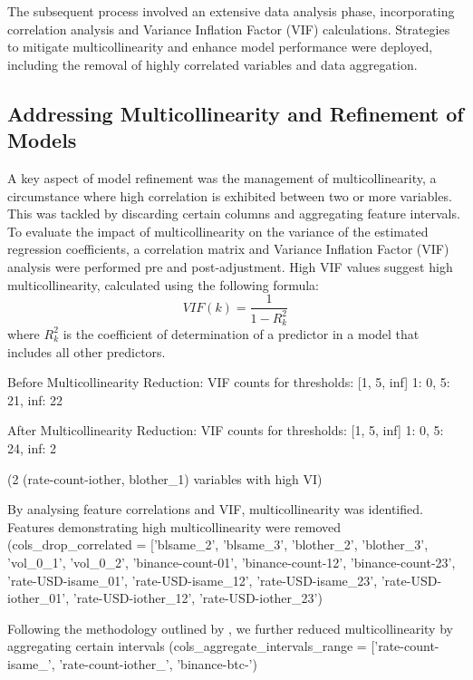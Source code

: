 \documentclass{article}
\begin{document}
The subsequent process involved an extensive data analysis phase, incorporating correlation analysis and Variance Inflation Factor (VIF) calculations. Strategies to mitigate multicollinearity and enhance model performance were deployed, including the removal of highly correlated variables and data aggregation.

\subsection{Addressing Multicollinearity and Refinement of Models}
A key aspect of model refinement was the management of multicollinearity, a circumstance where high correlation is exhibited between two or more variables. This was tackled by discarding certain columns and aggregating feature intervals. To evaluate the impact of multicollinearity on the variance of the estimated regression coefficients, a correlation matrix and Variance Inflation Factor (VIF) analysis were performed pre and post-adjustment. High VIF values suggest high multicollinearity, calculated using the following formula:
\begin{equation}
VIF(k) = \frac{1}{1 - R^2_k}
\end{equation}
where $R^2_k$ is the coefficient of determination of a predictor in a model that includes all other predictors. 

Before Multicollinearity Reduction: VIF counts for thresholds: [1, 5, inf]
1: 0, 5: 21, inf: 22

After Multicollinearity Reduction: VIF counts for thresholds: [1, 5, inf]
1: 0, 5: 24, inf: 2

(2 (rate-count-iother, blother\_1) variables with high VI)


By analysing feature correlations and VIF, multicollinearity was identified. Features demonstrating high multicollinearity were removed (cols\_drop\_correlated = ['blsame\_2', 'blsame\_3', 'blother\_2', 'blother\_3', 'vol\_0\_1', 'vol\_0\_2',
                        'binance-count-01', 'binance-count-12', 'binance-count-23',
                        'rate-USD-isame\_01', 'rate-USD-isame\_12', 'rate-USD-isame\_23',
                        'rate-USD-iother\_01', 'rate-USD-iother\_12', 'rate-USD-iother\_23')

Following the methodology outlined by \cite{Miori2023}, we further reduced multicollinearity by aggregating certain intervals (cols\_aggregate\_intervals\_range = ['rate-count-isame\_', 'rate-count-iother\_', 'binance-btc-')
\end{document}
